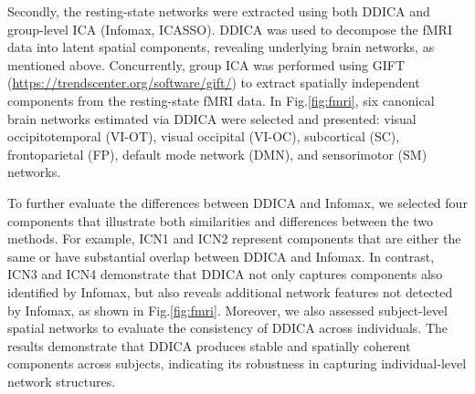 \documentclass{article}
\begin{document}
Secondly, the resting-state networks were extracted using both DDICA and group-level ICA (Infomax, ICASSO). DDICA was used to decompose the fMRI data into latent spatial components, revealing underlying brain networks, as mentioned above. Concurrently, group ICA was performed using GIFT (\url{https://trendscenter.org/software/gift/}) to extract spatially independent components from the resting-state fMRI data. In Fig.\ref{fig:fmri}, six canonical brain networks estimated via DDICA were selected and presented: visual occipitotemporal (VI-OT), visual occipital (VI-OC), subcortical (SC), frontoparietal (FP), default mode network (DMN), and sensorimotor (SM) networks.

To further evaluate the differences between DDICA and Infomax, we selected four components that illustrate both similarities and differences between the two methods. For example, ICN1 and ICN2 represent components that are either the same or have substantial overlap between DDICA and Infomax. In contrast, ICN3 and ICN4 demonstrate that DDICA not only captures components also identified by Infomax, but also reveals additional network features not detected by Infomax, as shown in Fig.\ref{fig:fmri}. Moreover, we also assessed subject-level spatial networks to evaluate the consistency of DDICA across individuals. The results demonstrate that DDICA produces stable and spatially coherent components across subjects, indicating its robustness in capturing individual-level network structures.
\end{document}
